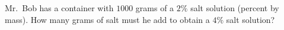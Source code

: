 Mr.\ Bob has a container with $1000$ grams of a $2\%$ salt solution (percent by mass). How many grams of salt must he add to obtain a $4\%$ salt solution?

